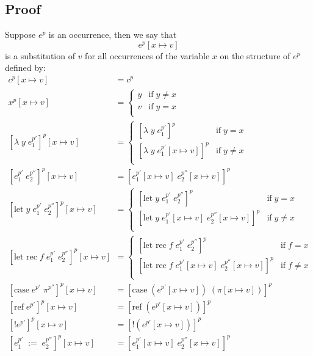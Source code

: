 \documentclass[../../master.tex]{subfiles}
\begin{document}
\subsection{Proof}
\begin{definition}[Substitutions]
	Suppose $e^p$ is an occurrence, then we say that
	$$e^p[x\mapsto v]$$
	is a substitution of $v$ for all occurrences of the variable $x$ on the structure of $e^p$ defined by:
	\begin{align*}
		c^p[x\mapsto v]&=c^p\\
		x^p[x\mapsto v]&=	\left\{\begin{matrix}
									y & \mbox{if}\;y \neq x\\ 
									v & \mbox{if}\;y = x\\ 
								\end{matrix}\right.\\
		[\lambda\;y\;e_1^{p'}]^p[x\mapsto v]&=
			\left\{\begin{matrix}
				[\lambda\;y\;e_1^{p'}]^p & \mbox{if}\;y = x\\ 
				[\lambda\;y\;e_1^{p'}[x\mapsto v]]^p & \mbox{if}\;y \neq x\\
			\end{matrix}\right.\\
		[e_1^{p'}\;e_2^{p''}]^p[x\mapsto v]&=[e_1^{p'}[x\mapsto v]\;e_2^{p''}[x\mapsto v]]^p\\
		[\mbox{let}\;y\;e_1^{p'}\;e_2^{p''}]^p[x\mapsto v]&=	
			\left\{\begin{matrix}
				[\mbox{let}\;y\;e_1^{p'}\;e_2^{p''}]^p & \mbox{if}\;y = x\\ 
				[\mbox{let}\;y\;e_1^{p'}[x\mapsto v]\;e_2^{p''}[x\mapsto v]]^p & \mbox{if}\;y \neq x\\ 
			\end{matrix}\right.\\
		[\mbox{let rec}\;f\;e_1^{p'}\;e_2^{p''}]^p[x\mapsto v]&=
			\left\{\begin{matrix}
				[\mbox{let rec}\;f\;e_1^{p'}\;e_2^{p''}]^p & \mbox{if}\;f = x\\ 
				[\mbox{let rec}\;f\;e_1^{p'}[x\mapsto v]\;e_2^{p''}[x\mapsto v]]^p & \mbox{if}\;f \neq x\\ 
			\end{matrix}\right.\\
		[\mbox{case}\;e^{p'}\;\pi^{p''}]^p[x\mapsto v]&=[\mbox{case}\;(e^{p'}[x\mapsto v])\;(\pi[x\mapsto v])]^p\\
		[\mbox{ref}\;e^{p'}]^p[x\mapsto v]&=[\mbox{ref}\;(e^{p'}[x\mapsto v])]^p\\
		[!e^{p'}]^p[x\mapsto v]&=[!(e^{p'}[x\mapsto v])]^p\\
		[e_1^{p'}\;:=\;e_2^{p''}]^p[x\mapsto v]&=[e_1^{p'}[x\mapsto v]\;e_2^{p''}[x\mapsto v]]^p\\
	\end{align*}
\end{definition}
\end{document}
